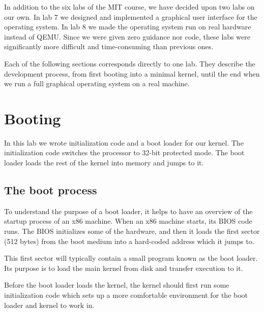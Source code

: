 \documentclass{report}
\begin{document}
In addition to the six labs of the MIT course, we have decided upon two labs
on our own. In lab 7 we designed and implemented a graphical user interface
for the operating system. In lab 8 we made the operating system run on real
hardware instead of QEMU. Since we were given zero guidance nor code, these
labs were significantly more difficult and time-consuming than previous ones.

Each of the following sections corresponds directly to one lab. They describe
the development process, from first booting into a minimal kernel, until the end
when we run a full graphical operating system on a real machine.









\chapter{Booting}
\label{sec:lab1}

In this lab we wrote initialization code and a boot loader for our kernel. 
The initialization code switches the processor to 32-bit protected mode. The
boot loader loads the rest of the kernel into memory and jumps to it.

\section{The boot process}
To understand the purpose of a boot loader, it helps to have an overview of
the startup process of an x86 machine.
When an x86 machine starts, its BIOS code runs. The BIOS initializes some of
the hardware, and then it loads the first sector (512 bytes) from the boot
medium into a hard-coded address which it jumps to.

This first sector will typically contain a small program known as the boot
loader. Its purpose is to load the main kernel from disk and transfer
execution to it.

Before the boot loader loads the kernel, the kernel should first run some
initialization code which sets up a more comfortable environment for the boot
loader and kernel to work in.
\end{document}
